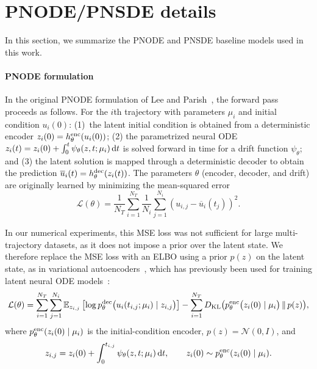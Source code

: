 \documentclass{article}
\begin{document}
	
	\section{PNODE/PNSDE details} \label{sec:pnodepnsde}
	
	In this section, we summarize the PNODE and PNSDE baseline models used in this work.
	
	
	\paragraph{PNODE formulation}
	
	In the original PNODE formulation of Lee and Parish~\cite{Lee_2021_Parameterized_Neural_ODE_ROM}, the forward pass proceeds as follows. For the $i$th trajectory with parameters $\mu_i$ and initial condition $u_i(0)$: (1)~the latent initial condition is obtained from a deterministic encoder $z_i(0) = h_\theta^{\rm enc}(u_i(0))$; (2) the parametrized neural ODE
	$z_i(t) = z_i(0) + \int_0^t \psi_\theta(z, t; \mu_i)\,{\rm d}t$
	is solved forward in time for a drift function $\psi_\theta$; and (3) the latent solution is mapped through a deterministic decoder to obtain the prediction $\overline{u}_i(t) = h_\theta^{\rm dec}(z_i(t))$. The parameters $\theta$ (encoder, decoder, and drift) are originally learned by minimizing the mean-squared error
	\begin{equation*}
		\mathcal{L}(\theta) = \frac{1}{N_T}\sum_{i=1}^{N_T}\frac{1}{N_i}\sum_{j=1}^{N_i}\left(u_{i,j} - \overline{u}_{i}(t_j)\right)^2.
	\end{equation*}
	
	In our numerical experiments, this MSE loss was not sufficient for large multi-trajectory datasets, as it does not impose a prior over the latent state. We therefore replace the MSE loss with an ELBO using a prior $p(z)$ on the latent state, as in variational autoencoders~\cite{Kingma_2022_Autoencoding_Variational_Bayes}, which has previously been used for training latent neural ODE models~\cite{Chen_2018_torchdiffeq, Rubanova_2019_NODE}:
	\begin{equation*}
		\mathcal{L}(\theta) = \sum_{i=1}^{N_T} \sum_{j=1}^{N_i} 
		\mathbb{E}_{ z_{i,j} }
		\left[ \log p_{\theta}^{\rm dec} \bigl( u_{i}(t_{i,j};  \mu_i) \mid z_{i,j} \bigr) \right]
		- \sum_{i=1}^{N_T} D_{\textrm{KL}}\bigl(p^{\rm enc}_\theta\bigl(z_{i}(0)\mid\mu_i\bigr) \,\|\, p(z)\bigr),
	\end{equation*}
	where $p_\theta^{\rm enc}(z_i(0)\mid \mu_i)$ is the initial-condition encoder, $p(z) = \mathcal{N}(0, I)$, and
	\begin{equation*}
		z_{i,j} = z_i(0) + \int_0^{t_{i,j}}\psi_\theta(z, t; \mu_i)\,{\rm d}t,
		\qquad 
		z_i(0) \sim p_\theta^{\rm enc}(z_i(0)\mid \mu_i).
	\end{equation*}
	
\end{document}
